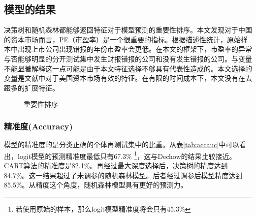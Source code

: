 \documentclass{article}
\begin{document}
\subsection{模型的结果}
\par 决策树和随机森林都能够返回特征对于模型预测的重要性排序。本文发现对于中国的资本市场而言，PE（市盈率）是一个很重要的指标。根据描述性统计，原始样本中出现上市公司出现错报的年份市盈率会更低。在本文的框架下，市盈率的异常与否能够明显的分开测试集中发生财报错报的公司和没有发生错报的公司。与变量不能显著解释这一点可能是由于本文特征选择不够具有代表性造成的。本文选择的变量是文献中对于美国资本市场有效的特征。在有限的时间成本下，本文没有在去跟多的扩展特征。
\begin{figure}[htbp]
    \centering
    \caption{重要性排序}
\end{figure}

\subsubsection{精准度(Accuracy)}
\par 模型的精准度的是分类正确的个体再测试集中的比重。从表\ref{tab:accauc}中可以看出，logit模型的预测精准度最低只有67.3\% \footnote{若使用原始的样本，那么logit模型精准度将会只有45.3\%}，这与Dechow\cite{Dechow2006The}的结果比较接近。CART算法的精准度是82.1\%。再经过最大深度选择后，决策树的精度达到84.7\%。这一结果超过了未调参的随机森林模型。后者经过调参后模型精度达到85.5\%。从精度这个角度，随机森林模型具有更好的预测力。
\end{document}
